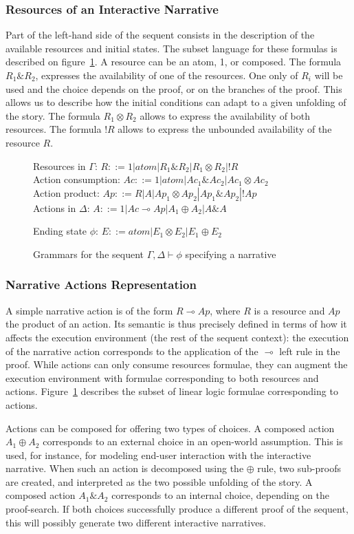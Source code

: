 \documentclass[runningheads,a4paper]{llncs}
\begin{document}
\subsubsection{Resources of an Interactive Narrative}
Part of the left-hand side of the sequent consists in the description of the available resources and initial states. The subset language for these formulas is described on figure~\ref{sequent_grammars}. A resource can be an atom, 1, or composed. The formula $R_{1}\&R_{2}$, expresses the availability of one of the resources. One only of $R_{i}$ will be used and the choice depends on the proof, or on the branches of the proof. This allows us to describe how the initial conditions can adapt to a given unfolding of the story. The formula $R_{1} \otimes R_{2}$ allows to express the availability of both resources. The formula $!R$ allows to express the unbounded availability of the resource $R$.
\begin{figure}
Resources in $\Gamma$: $R::= 1| atom | R_{1}\&R_{2} | R_{1} \otimes R_{2} | !R $\\
Action consumption: $Ac ::= 1 | atom | Ac_{1}\&Ac_{2} | Ac_{1} \otimes Ac_{2}$\\
Action product: $Ap::= R | A | Ap_{1} \otimes Ap_{2} | Ap_{1}\& Ap_{2} | !Ap$\\
Actions in $\Delta$: $A::= 1 | Ac \multimap Ap | A_{1} \oplus A_{2} | A\& A$

Ending state $\phi$: $E::= atom | E_{1} \otimes E_{2} | E_{1} \oplus E_{2}$
\caption{Grammars for the sequent $\Gamma , \Delta \vdash \phi$ specifying a narrative\label{sequent_grammars}}
\end{figure}
\subsubsection{Narrative Actions Representation}
A simple narrative action is of the form $R \multimap Ap$, where $R$ is a resource and $Ap$ the product of an action. Its semantic is thus precisely defined in terms of how it affects the execution environment (the rest of the sequent context): the execution of the narrative action corresponds to the application of the $\multimap$ left rule in the proof. While actions can only consume resources formulae, they can augment the execution environment with formulae corresponding to both resources and actions. Figure~\ref{sequent_grammars} describes the subset of linear logic formulae corresponding to actions.

Actions can be composed for offering two types of choices. A composed action $A_{1} \oplus A_{2}$ corresponds to an external choice in an open-world assumption. This is used, for instance, for modeling end-user interaction with the interactive narrative. When such an action is decomposed using the $\oplus$ rule, two sub-proofs are created, and interpreted as the two possible unfolding of the story. A composed action $A_{1} \& A_{2}$ corresponds to an internal choice, depending on the proof-search. If both choices successfully produce a different proof of the sequent, this will possibly generate two different interactive narratives.
\end{document}
